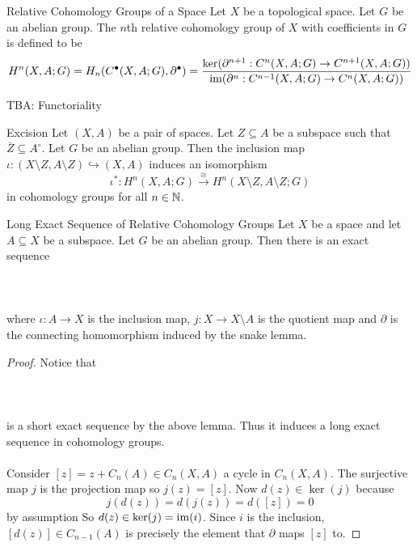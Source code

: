 \documentclass[a4paper]{article}
\begin{document}
\begin{defn}{Relative Cohomology Groups of a Space}{} Let $X$ be a topological space. Let $G$ be an abelian group. The $n$th relative cohomology group of $X$ with coefficients in $G$ is defined to be $$H^n(X,A;G)=H_n(C^\bullet(X,A;G),\partial^\bullet)=\frac{\ker(\partial^{n+1}:C^n(X,A;G)\to C^{n+1}(X,A;G))}{\operatorname{im}(\partial^n:C^{n-1}(X,A;G)\to C^n(X,A;G))}$$
\end{defn}

TBA: Functoriality

\begin{thm}{Excision}{} Let $(X,A)$ be a pair of spaces. Let $Z\subseteq A$ be a subspace such that $\overline{Z}\subseteq A^\circ$. Let $G$ be an abelian group. Then the inclusion map $\iota:(X\setminus Z,A\setminus Z)\hookrightarrow(X,A)$ induces an isomorphism $$\iota^\ast:H^n(X,A;G)\overset{\cong}{\longrightarrow}H^n(X\setminus Z,A\setminus Z;G)$$ in cohomology groups for all $n\in\mathbb{N}$. 
\end{thm}

\begin{thm}{Long Exact Sequence of Relative Cohomology Groups}{} Let $X$ be a space and let $A\subseteq X$ be a subspace. Let $G$ be an abelian group. Then there is an exact sequence \\~\\
\\~\\
where $\iota:A\to X$ is the inclusion map, $j:X\to X\setminus A$ is the quotient map and $\partial$ is the connecting homomorphism induced by the snake lemma. \tcbline
\begin{proof}
Notice that \\~\\
\\~\\
is a short exact sequence by the above lemma. Thus it induces a long exact sequence in cohomology groups. \\~\\

Consider $[z]=z+C_n(A)\in C_n(X,A)$ a cycle in $C_n(X,A)$. The surjective map $j$ is the projection map so $j(z)=[z]$. Now $d(z)\in\ker(j)$ because $$j(d(z))=d(j(z))=d([z])=0$$ by assumption So $d(z)\in\ker(j)=\operatorname{im}(i)$. Since $i$ is the inclusion, $[d(z)]\in C_{n-1}(A)$ is precisely the element that $\partial$ maps $[z]$ to. 
\end{proof}
\end{thm}
\end{document}
